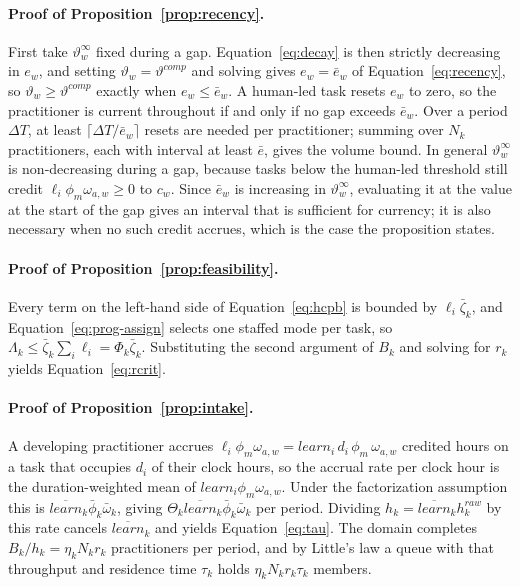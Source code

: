 \documentclass[utf8]{frontiers_suppmat}
\begin{document}
\paragraph*{Proof of Proposition~\ref{prop:recency}.}
	First take $\vartheta^{\infty}_w$ fixed during a gap. Equation~\eqref{eq:decay} is then strictly decreasing in $e_w$, and setting $\vartheta_w=\vartheta^{comp}$ and solving gives $e_w=\bar e_w$ of Equation~\eqref{eq:recency}, so $\vartheta_w\ge\vartheta^{comp}$ exactly when $e_w\le\bar e_w$. A human-led task resets $e_w$ to zero, so the practitioner is current throughout if and only if no gap exceeds $\bar e_w$. Over a period $\Delta T$, at least $\lceil\Delta T/\bar e_w\rceil$ resets are needed per practitioner; summing over $N_k$ practitioners, each with interval at least $\bar e$, gives the volume bound. In general $\vartheta^{\infty}_w$ is non-decreasing during a gap, because tasks below the human-led threshold still credit $\ell_i\phi_m\omega_{a,w}\ge0$ to $c_w$. Since $\bar e_w$ is increasing in $\vartheta^{\infty}_w$, evaluating it at the value at the start of the gap gives an interval that is sufficient for currency; it is also necessary when no such credit accrues, which is the case the proposition states.

\paragraph*{Proof of Proposition~\ref{prop:feasibility}.}
	Every term on the left-hand side of Equation~\eqref{eq:hcpb} is bounded by $\ell_i\bar\zeta_k$, and Equation~\eqref{eq:prog-assign} selects one staffed mode per task, so $\Lambda_k\le\bar\zeta_k\sum_i\ell_i=\Phi_k\bar\zeta_k$. Substituting the second argument of $B_k$ and solving for $r_k$ yields Equation~\eqref{eq:rcrit}.

\paragraph*{Proof of Proposition~\ref{prop:intake}.}
	A developing practitioner accrues $\ell_i\phi_m\omega_{a,w}=learn_i\,d_i\,\phi_m\,\omega_{a,w}$ credited hours on a task that occupies $d_i$ of their clock hours, so the accrual rate per clock hour is the duration-weighted mean of $learn_i\phi_m\omega_{a,w}$. Under the factorization assumption this is $\overline{learn}_k\bar\phi_k\bar\omega_k$, giving $\Theta_k\overline{learn}_k\bar\phi_k\bar\omega_k$ per period. Dividing $h_k=\overline{learn}_k h^{raw}_k$ by this rate cancels $\overline{learn}_k$ and yields Equation~\eqref{eq:tau}. The domain completes $B_k/h_k=\eta_kN_kr_k$ practitioners per period, and by Little's law a queue with that throughput and residence time $\tau_k$ holds $\eta_kN_kr_k\tau_k$ members.
\end{document}
